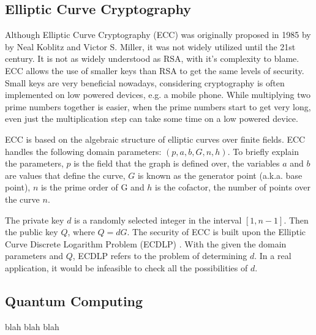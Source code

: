 \subsection{Elliptic Curve Cryptography}

Although Elliptic Curve Cryptography (ECC) was originally proposed in 1985 by by Neal Koblitz and Victor S. Miller, it was not widely utilized until the 21st century. It is not as widely understood as RSA, with it's complexity to blame. ECC allows the use of smaller keys than RSA to get the same levels of security. Small keys are very beneficial nowadays, considering cryptography is often implemented on low powered devices, e.g. a mobile phone. While multiplying two prime numbers together is easier, when the prime numbers start to get very long, even just the multiplication step can take some time on a low powered device.

ECC is based on the algebraic structure of elliptic curves over finite fields\cite{RSA_ECC}. ECC handles the following domain parameters: \((p,a,b,G,n,h)\). To briefly explain the parameters, \(p\) is the field that the graph is defined over, the variables \(a\) and \(b\) are values that define the curve, \(G\) is known as the generator point (a.k.a. base point), \(n\) is the prime order of G and \(h\) is the cofactor, the number of points over the curve \(n\).

The private key \(d\) is a randomly selected integer in the interval \( [ 1 , n - 1 ]\). Then the public key \(Q\), where \(Q=dG\). The security of ECC is built upon the Elliptic Curve Discrete Logarithm Problem (ECDLP) \cite{RSA_ECC}. With the given the domain parameters and \(Q\), ECDLP refers to the problem of determining \(d\). In a real application, it would be infeasible to check all the possibilities of \(d\).

\subsection{Quantum Computing}
blah blah blah